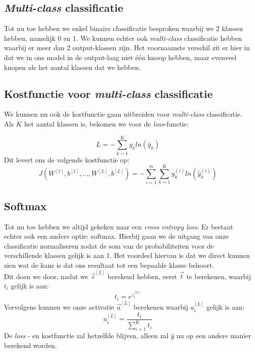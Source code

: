 \subsection{\textit{Multi-class} classificatie}

Tot nu toe hebben we enkel binaire classificatie besproken waarbij we 2 klassen hebben, namelijk 0 en 1. We kunnen echter ook \textit{multi-class} classificatie hebben waarbij er meer dan 2 output-klassen zijn. Het voornaamste verschil zit er hier in dat we in ons model in de output-laag niet één knoop hebben, maar evenveel knopen als het aantal klassen dat we hebben.

\subsection{Kostfunctie voor \textit{multi-class} classificatie}

We kunnen nu ook de kostfunctie gaan uitbreiden voor \textit{multi-class} classificatie. Als $K$ het aantal klassen is, bekomen we voor de \textit{loss}-functie:

\begin{equation}
	L = - \sum_{k=1}^{K} y_{k} ln( \hat{y}_{k})
\end{equation}
\noindent
Dit levert ons de volgende kostfunctie op:
\begin{equation}
	J(W^{[1]}, b^{[1]}, ..., W^{[L]}, b^{[L]}) = - \sum_{i=1}^{m} \sum_{k=1}^{K} y_{k}^{(i)} ln( \hat{y}_{k}^{(i)})
\end{equation}

\subsection{Softmax}
\label{ch:softmax}
Tot nu toe hebben we altijd gekeken naar een \textit{cross entropy loss}. Er bestaat echter ook een andere optie: softmax. Hierbij gaan we de uitgang van onze classificatie normaliseren zodat de som van de probabiliteiten voor de verschillende klassen gelijk is aan 1. Het voordeel hiervan is dat we direct kunnen zien wat de kans is dat ons resultaat tot een bepaalde klasse behoort.\\
\newline
Dit doen we door, nadat we $\vec{z}^{[L]}$ berekend hebben, eerst $\vec{t}$ te berekenen, waarbij $t_{i}$ gelijk is aan:
\begin{equation}
	t_{i} = e^{z_{i}^{[L]}}
\end{equation}
\noindent
Vervolgens kunnen we onze activatie $\vec{a}^{[L]}$ berekenen waarbij $a_{i}^{[L]}$ gelijk is aan:
\begin{equation}
	a_{i}^{[L]} = \frac{t_{i}}{\sum_{i=1}^{K} t_{i}}
\end{equation}
\noindent
De \textit{loss} - en kostfunctie zal hetzelfde blijven, alleen zal $\hat{y}$ nu op een andere manier berekend worden. 

